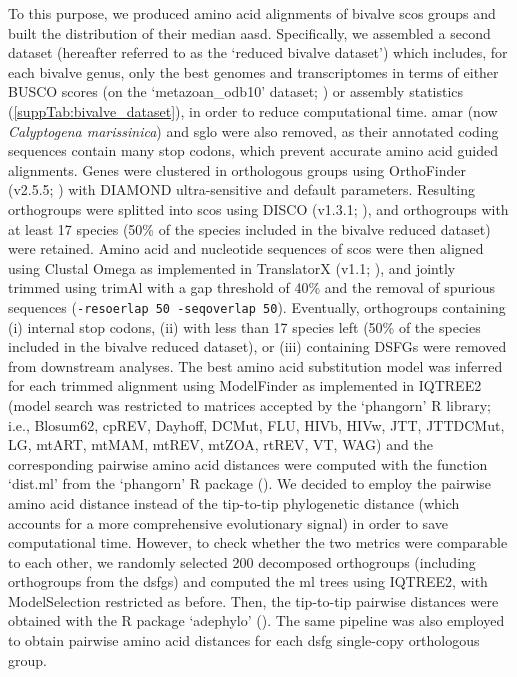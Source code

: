 To this purpose, we produced amino acid alignments of bivalve \glspl{sco} groups and built the distribution of their median \gls{aasd}. Specifically, we assembled a second dataset (hereafter referred to as the ‘reduced bivalve dataset’) which includes, for each bivalve genus, only the best genomes and transcriptomes in terms of either BUSCO scores (on the ‘metazoan\_odb10’ dataset; \textbf{\cite{manni2021busco}}) or assembly statistics (\cref{suppTab:bivalve_dataset}), in order to reduce computational time. \gls{amar} (now \textit{Calyptogena marissinica}) and \gls{sglo} were also removed, as their annotated coding sequences contain many stop codons, which prevent accurate amino acid guided alignments. Genes were clustered in orthologous groups using OrthoFinder (v2.5.5; \textbf{\cite{emms2019orthofinder}}) with DIAMOND ultra-sensitive and default parameters. Resulting orthogroups were splitted into \glspl{sco} using DISCO (v1.3.1; \textbf{\cite{willson2022disco}}), and orthogroups with at least 17 species (50\% of the species included in the bivalve reduced dataset) were retained. Amino acid and nucleotide sequences of \glspl{sco} were then aligned using Clustal Omega as implemented in TranslatorX (v1.1; \textbf{\cite{abascal2010translatorx}}), and jointly trimmed using trimAl with a gap threshold of 40\% and the removal of spurious sequences (\verb|-resoerlap 50 -seqoverlap 50|). Eventually, orthogroups containing (i) internal stop codons, (ii) with less than 17 species left (50\% of the species included in the bivalve reduced dataset), or (iii) containing DSFGs were removed from downstream analyses. The best amino acid substitution model was inferred for each trimmed alignment using ModelFinder as implemented in IQTREE2 (model search was restricted to matrices accepted by the ‘phangorn’ R library; i.e., Blosum62, cpREV, Dayhoff, DCMut, FLU, HIVb, HIVw, JTT, JTTDCMut, LG, mtART, mtMAM, mtREV, mtZOA, rtREV, VT, WAG) and the corresponding pairwise amino acid distances were computed with the function ‘dist.ml’ from the ‘phangorn’ R package (\textbf{\cite{schliep2011phangorn}}). We decided to employ the pairwise amino acid distance instead of the tip-to-tip phylogenetic distance (which accounts for a more comprehensive evolutionary signal) in order to save computational time. However, to check whether the two metrics were comparable to each other, we randomly selected 200 decomposed orthogroups (including orthogroups from the \glspl{dsfg}) and computed the \gls{ml} trees using IQTREE2, with ModelSelection restricted as before. Then, the tip-to-tip pairwise distances were obtained with the R package ‘adephylo’ (\textbf{\cite{jombart2010adephylo}}). The same pipeline was also employed to obtain pairwise amino acid distances for each \gls{dsfg} single-copy orthologous group.

